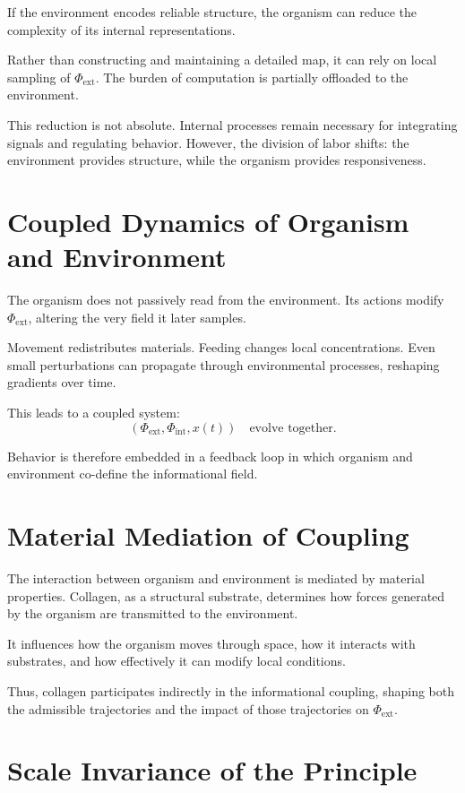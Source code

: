 \documentclass[11pt,oneside]{book}
\begin{document}
If the environment encodes reliable structure, the organism can reduce the complexity of its internal representations.

Rather than constructing and maintaining a detailed map, it can rely on local sampling of $\Phi_{\mathrm{ext}}$. The burden of computation is partially offloaded to the environment.

This reduction is not absolute. Internal processes remain necessary for integrating signals and regulating behavior. However, the division of labor shifts: the environment provides structure, while the organism provides responsiveness.

\section{Coupled Dynamics of Organism and Environment}

The organism does not passively read from the environment. Its actions modify $\Phi_{\mathrm{ext}}$, altering the very field it later samples.

Movement redistributes materials. Feeding changes local concentrations. Even small perturbations can propagate through environmental processes, reshaping gradients over time.

This leads to a coupled system:
\[
(\Phi_{\mathrm{ext}}, \Phi_{\mathrm{int}}, x(t)) \quad \text{evolve together}.
\]

Behavior is therefore embedded in a feedback loop in which organism and environment co-define the informational field.

\section{Material Mediation of Coupling}

The interaction between organism and environment is mediated by material properties. Collagen, as a structural substrate, determines how forces generated by the organism are transmitted to the environment.

It influences how the organism moves through space, how it interacts with substrates, and how effectively it can modify local conditions.

Thus, collagen participates indirectly in the informational coupling, shaping both the admissible trajectories and the impact of those trajectories on $\Phi_{\mathrm{ext}}$.

\section{Scale Invariance of the Principle}
\end{document}
